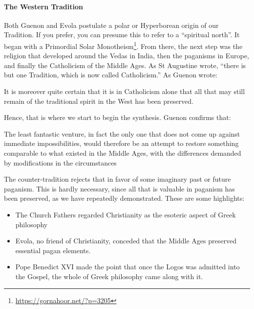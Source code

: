 \paragraph{The Western Tradition}


Both Guenon and Evola postulate a polar or Hyperborean origin of our Tradition. If you prefer, you can presume this to refer to a ``spiritual north''. It began with a Primordial Solar Monotheism\footnote{\url{https://gornahoor.net/?p=3205}}. From there, the next step was the religion that developed around the Vedas in India, then the paganisms in Europe, and finally the Catholicism of the Middle Ages. As St Augustine wrote, ``there is but one Tradition, which is now called Catholicism.'' As Guenon wrote:

\begin{quotex}
It is moreover quite certain that it is in Catholicism alone that all that may still remain of the traditional spirit in the West has been preserved.
\end{quotex}


Hence, that is where we start to begin the synthesis. Guenon confirms that:

\begin{quotex}
The least fantastic venture, in fact the only one that does not come up against immediate impossibilities, would therefore be an attempt to restore something comparable to what existed in the Middle Ages, with the differences demanded by modifications in the circumstances
\end{quotex}


The counter-tradition rejects that in favor of some imaginary past or future paganism. This is hardly necessary, since all that is valuable in paganism has been preserved, as we have repeatedly demonstrated. These are some highlights:

\begin{itemize}


\item The Church Fathers regarded Christianity as the esoteric aspect of Greek philosophy

\item Evola, no friend of Christianity, conceded that the Middle Ages preserved essential pagan elements.

\item Pope Benedict XVI made the point that once the Logos was admitted into the Gospel, the whole of Greek philosophy came along with it.
\end{itemize}


